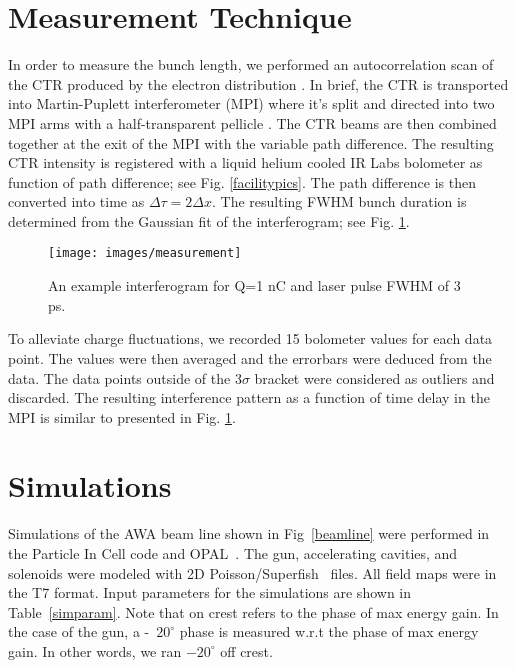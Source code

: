 \documentclass[letterpaper,  %
              ]{jacow-2_3}   %
\begin{document}
\section{Measurement Technique}
In order to measure the bunch length, we performed an autocorrelation scan
of the CTR produced by the electron distribution \cite{Happek, WBarry}.
In brief, the CTR is transported into Martin-Puplett interferometer (MPI)
where it's split and directed into two MPI arms with a half-transparent pellicle \cite{PhysRevSTAB.9.082801}. 
The CTR beams are then combined together at the exit of the MPI with the variable path difference.
The resulting CTR intensity is registered with a liquid helium cooled IR Labs
bolometer \cite{IRlabs} as function of path difference; see Fig. \ref{facilitypics}.
The path difference is then converted into time as $\Delta \tau = 2 \Delta x$.
The resulting FWHM bunch duration is determined from the Gaussian fit of 
the interferogram; see Fig. \ref{interferogram}.
\begin{figure}
 \texttt{[image: images/measurement]}
 \caption{An example interferogram for Q=1 nC and laser pulse FWHM of 3 ps.}
 \label{interferogram}
\end{figure}
To alleviate charge fluctuations, we recorded 15 bolometer values for each data point.
The values were then averaged and the errorbars were deduced from the data. The data points
outside of the 3$\sigma$ bracket were considered as outliers and discarded. The resulting
interference pattern as a function of time delay in the MPI is similar to presented in Fig. \ref{interferogram}.

\section{Simulations}
Simulations of the AWA beam line shown in Fig~\ref{beamline}
were performed in the Particle In Cell code and OPAL~\cite{opal}.
The gun, accelerating cavities, and solenoids were modeled with 2D
Poisson/Superfish~\cite{fish} files. All field maps were in the T7 format.
Input parameters for the simulations are shown in Table~\ref{simparam}.
Note that on crest refers to the phase of max energy gain.
In the case of the gun, a -~$20^{\circ}$ phase is measured 
w.r.t the phase of max energy gain. 
In other words, we ran $-20^{\circ}$ off crest.

\begin{figure*}[!tbh]
	\centering
	\begin{tikzpicture}[scale=1.0, text=black]
	
	\end{tikzpicture}	
	\caption{Beam line layout at the AWA.}
	\label{beamline}
\end{figure*}
\end{document}
